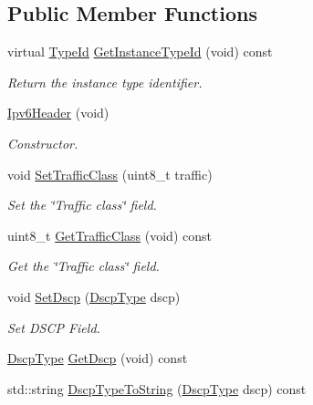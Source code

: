 \subsection*{Public Member Functions}
\begin{DoxyCompactItemize}
\item 
virtual \hyperlink{classns3_1_1TypeId}{Type\+Id} \hyperlink{classns3_1_1Ipv6Header_a5345816633cf6016b75affc1de8bee02}{Get\+Instance\+Type\+Id} (void) const 
\begin{DoxyCompactList}\small\item\em Return the instance type identifier. \end{DoxyCompactList}\item 
\hyperlink{classns3_1_1Ipv6Header_a7792ee24c825023aa93906ea75660d18}{Ipv6\+Header} (void)
\begin{DoxyCompactList}\small\item\em Constructor. \end{DoxyCompactList}\item 
void \hyperlink{classns3_1_1Ipv6Header_ab40aa33cac2e23292abef3410a1277ab}{Set\+Traffic\+Class} (uint8\+\_\+t traffic)
\begin{DoxyCompactList}\small\item\em Set the \char`\"{}\+Traffic class\char`\"{} field. \end{DoxyCompactList}\item 
uint8\+\_\+t \hyperlink{classns3_1_1Ipv6Header_a8cf18c5dcde898d450554a3a001e03e4}{Get\+Traffic\+Class} (void) const 
\begin{DoxyCompactList}\small\item\em Get the \char`\"{}\+Traffic class\char`\"{} field. \end{DoxyCompactList}\item 
void \hyperlink{classns3_1_1Ipv6Header_abd6db43343e14d84cd3dad636b5392a5}{Set\+Dscp} (\hyperlink{classns3_1_1Ipv6Header_afdc89ed9acd990a7613782323e4c95ee}{Dscp\+Type} dscp)
\begin{DoxyCompactList}\small\item\em Set D\+S\+CP Field. \end{DoxyCompactList}\item 
\hyperlink{classns3_1_1Ipv6Header_afdc89ed9acd990a7613782323e4c95ee}{Dscp\+Type} \hyperlink{classns3_1_1Ipv6Header_acd88c1efe356aad36789f86319bb9530}{Get\+Dscp} (void) const 
\item 
std\+::string \hyperlink{classns3_1_1Ipv6Header_a42c5d53b17d55d813aa55ae07fb0cb6f}{Dscp\+Type\+To\+String} (\hyperlink{classns3_1_1Ipv6Header_afdc89ed9acd990a7613782323e4c95ee}{Dscp\+Type} dscp) const 

\end{DoxyCompactItemize}
